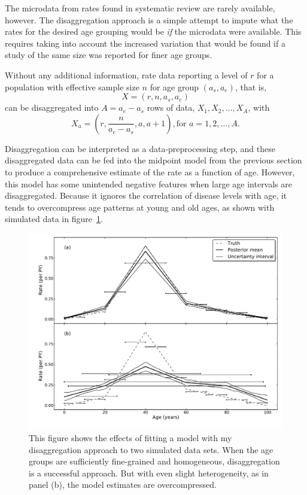 The microdata from rates found in systematic review are rarely
available, however. The disaggregation approach is a simple attempt to
impute what the rates for the desired age grouping would be \emph{if}
the microdata were available. This requires taking into account the
increased variation that would be found if a study of the same size
was reported for finer age groups.

Without any additional information, rate data reporting a level of $r$
for a population with effective sample size $n$ for age group $(a_s,a_e)$, that is,
\[
X = (r, n, a_s, a_e)
\]
can be disaggregated into $A = a_e-a_s$ rows of
data, $X_1, X_2, \ldots, X_A$, with
\[
X_a = \left(r, \frac{n}{a_e-a_s}, a, a+1\right), \text{for } a=1,2,\ldots,A.
\]

Disaggregation can be interpreted as a data-preprocessing step, and
these disaggregated data can be fed into the midpoint model from the
previous section to produce a comprehensive estimate of the rate as a
function of age. However, this model has some unintended negative
features when large age intervals are disaggregated.  Because it
ignores the correlation of disease levels with age, it tends to
overcompress age patterns at young and old ages, as shown with simulated data in figure~\ref{disagg}.

\begin{figure}[h]
\begin{center}
\includegraphics[width=\textwidth]{age_group_disagg.pdf}
\caption{This figure shows the effects of fitting a model with my
  disaggregation approach to two simulated data sets.  When the age groups are sufficiently
  fine-grained and homogeneous, disaggregation is a successful
  approach.  But with even slight heterogeneity, as in panel (b), the model
  estimates are overcompressed.}
\label{disagg}
\end{center}
\end{figure}


